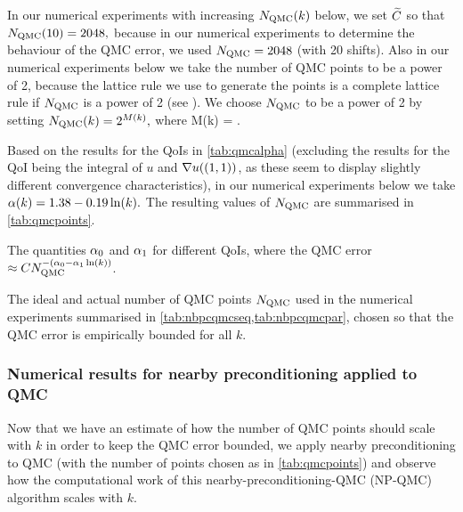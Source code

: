 In our numerical experiments with increasing $N_{\mathrm{QMC}}(k)$ below, we set $\widetilde{C}$ so that $N_{\mathrm{QMC}}(10) = 2048,$ because in our numerical experiments to determine the behaviour of the QMC error, we used $N_{\mathrm{QMC}} = 2048$ (with 20 shifts). Also in our numerical experiments below we take the number of QMC points to be a power of 2, because the lattice rule we use to generate the points is a complete lattice rule if $N_{\mathrm{QMC}}$ is a power of 2 (see \cite{NuREADME}). We choose $N_{\mathrm{QMC}}$ to be a power of 2 by setting $N_{\mathrm{QMC}}(k) = 2^{M(k)},$ where
\beqs
M(k) = .
\eeqs

Based on the results for the QoIs in \cref{tab:qmcalpha} (excluding the results for the QoI being the integral of $u$ and $\nabla u((1,1))$, as these seem to display slightly different convergence characteristics), in our numerical experiments below we take $\alpha(k) = 1.38 - 0.19  \operatorname{ln}(k).$ The resulting values of $N_{\mathrm{QMC}}$ are summarised in \cref{tab:qmcpoints}.

\begin{table}[h!]
  \centering
  
  \caption{The quantities $\alpha_{0}$ and $\alpha_{1}$ for different QoIs, where the QMC error $\approx C \NQMC^{-\mleft(\alphaz - \alphao\loge(k)\mright)}$.}\label{tab:qmcalpha}
  \end{table}


\begin{table}[h]
  \centering
  
  \caption{The ideal and actual number of QMC points $N_{\mathrm{QMC}}$ used in the numerical experiments summarised in \cref{tab:nbpcqmcseq,tab:nbpcqmcpar}, chosen so that the QMC error is empirically bounded for all $k$.\label{tab:qmcpoints}}
  \end{table}

\subsubsection{Numerical results for nearby preconditioning applied to QMC}

Now that we have an estimate of how the number of QMC points should scale with $k$ in order to keep the QMC error bounded, we apply nearby preconditioning to QMC (with the number of points chosen as in \cref{tab:qmcpoints}) and observe how the computational work of this nearby-preconditioning-QMC (NP-QMC) algorithm scales with $k.$

